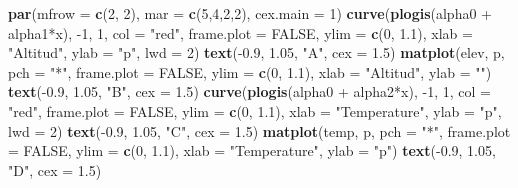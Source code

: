 \documentclass[]{book}
\newenvironment{Shaded}{\begin{snugshade}}{\end{snugshade}}
\newcommand{\KeywordTok}[1]{\textcolor[rgb]{0.13,0.29,0.53}{\textbf{{#1}}}}
\newcommand{\DataTypeTok}[1]{\textcolor[rgb]{0.13,0.29,0.53}{{#1}}}
\newcommand{\DecValTok}[1]{\textcolor[rgb]{0.00,0.00,0.81}{{#1}}}
\newcommand{\FloatTok}[1]{\textcolor[rgb]{0.00,0.00,0.81}{{#1}}}
\newcommand{\StringTok}[1]{\textcolor[rgb]{0.31,0.60,0.02}{{#1}}}
\newcommand{\OtherTok}[1]{\textcolor[rgb]{0.56,0.35,0.01}{{#1}}}
\newcommand{\NormalTok}[1]{{#1}}
\begin{document}
\begin{Shaded}
\begin{Highlighting}[]
\KeywordTok{par}\NormalTok{(}\DataTypeTok{mfrow =} \KeywordTok{c}\NormalTok{(}\DecValTok{2}\NormalTok{, }\DecValTok{2}\NormalTok{), }\DataTypeTok{mar =} \KeywordTok{c}\NormalTok{(}\DecValTok{5}\NormalTok{,}\DecValTok{4}\NormalTok{,}\DecValTok{2}\NormalTok{,}\DecValTok{2}\NormalTok{), }\DataTypeTok{cex.main =} \DecValTok{1}\NormalTok{)}
\KeywordTok{curve}\NormalTok{(}\KeywordTok{plogis}\NormalTok{(alpha0 +}\StringTok{ }\NormalTok{alpha1*x), -}\DecValTok{1}\NormalTok{, }\DecValTok{1}\NormalTok{, }\DataTypeTok{col =} \StringTok{"red"}\NormalTok{, }\DataTypeTok{frame.plot =} \OtherTok{FALSE}\NormalTok{, }\DataTypeTok{ylim =} \KeywordTok{c}\NormalTok{(}\DecValTok{0}\NormalTok{, }\FloatTok{1.1}\NormalTok{), }
      \DataTypeTok{xlab =} \StringTok{"Altitud"}\NormalTok{, }\DataTypeTok{ylab =} \StringTok{"p"}\NormalTok{, }\DataTypeTok{lwd =} \DecValTok{2}\NormalTok{)}
\KeywordTok{text}\NormalTok{(-}\FloatTok{0.9}\NormalTok{, }\FloatTok{1.05}\NormalTok{, }\StringTok{"A"}\NormalTok{, }\DataTypeTok{cex =} \FloatTok{1.5}\NormalTok{)}
\KeywordTok{matplot}\NormalTok{(elev, p, }\DataTypeTok{pch =} \StringTok{"*"}\NormalTok{, }\DataTypeTok{frame.plot =} \OtherTok{FALSE}\NormalTok{, }\DataTypeTok{ylim =} \KeywordTok{c}\NormalTok{(}\DecValTok{0}\NormalTok{, }\FloatTok{1.1}\NormalTok{), }\DataTypeTok{xlab =} \StringTok{"Altitud"}\NormalTok{, }
        \DataTypeTok{ylab =} \StringTok{""}\NormalTok{)}
\KeywordTok{text}\NormalTok{(-}\FloatTok{0.9}\NormalTok{, }\FloatTok{1.05}\NormalTok{, }\StringTok{"B"}\NormalTok{, }\DataTypeTok{cex =} \FloatTok{1.5}\NormalTok{)}
\KeywordTok{curve}\NormalTok{(}\KeywordTok{plogis}\NormalTok{(alpha0 +}\StringTok{ }\NormalTok{alpha2*x), -}\DecValTok{1}\NormalTok{, }\DecValTok{1}\NormalTok{, }\DataTypeTok{col =} \StringTok{"red"}\NormalTok{, }\DataTypeTok{frame.plot =} \OtherTok{FALSE}\NormalTok{, }\DataTypeTok{ylim =} \KeywordTok{c}\NormalTok{(}\DecValTok{0}\NormalTok{, }\FloatTok{1.1}\NormalTok{), }
      \DataTypeTok{xlab =} \StringTok{"Temperature"}\NormalTok{, }\DataTypeTok{ylab =} \StringTok{"p"}\NormalTok{, }\DataTypeTok{lwd =} \DecValTok{2}\NormalTok{)}
\KeywordTok{text}\NormalTok{(-}\FloatTok{0.9}\NormalTok{, }\FloatTok{1.05}\NormalTok{, }\StringTok{"C"}\NormalTok{, }\DataTypeTok{cex =} \FloatTok{1.5}\NormalTok{)}
\KeywordTok{matplot}\NormalTok{(temp, p, }\DataTypeTok{pch =} \StringTok{"*"}\NormalTok{, }\DataTypeTok{frame.plot =} \OtherTok{FALSE}\NormalTok{, }\DataTypeTok{ylim =} \KeywordTok{c}\NormalTok{(}\DecValTok{0}\NormalTok{, }\FloatTok{1.1}\NormalTok{), }\DataTypeTok{xlab =} \StringTok{"Temperature"}\NormalTok{, }
        \DataTypeTok{ylab =} \StringTok{"p"}\NormalTok{)}
\KeywordTok{text}\NormalTok{(-}\FloatTok{0.9}\NormalTok{, }\FloatTok{1.05}\NormalTok{, }\StringTok{"D"}\NormalTok{, }\DataTypeTok{cex =} \FloatTok{1.5}\NormalTok{)}
\end{Highlighting}
\end{Shaded}
\end{document}
